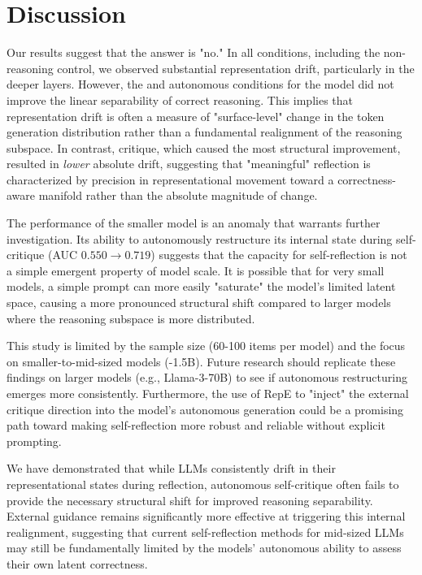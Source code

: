 \section{Discussion}
\label{sec:discussion}

 Our results suggest that the answer is "no." In all conditions, including the non-reasoning \rewrite control, we observed substantial representation drift, particularly in the deeper layers. However, the \rewrite and autonomous \selfone conditions for the \qwenonefive model did not improve the linear separability of correct reasoning. This implies that representation drift is often a measure of "surface-level" change in the token generation distribution rather than a fundamental realignment of the reasoning subspace. In contrast, \external critique, which caused the most structural improvement, resulted in \textit{lower} absolute drift, suggesting that "meaningful" reflection is characterized by precision in representational movement toward a correctness-aware manifold rather than the absolute magnitude of change.

 The performance of the smaller \qwenzerofive model is an anomaly that warrants further investigation. Its ability to autonomously restructure its internal state during self-critique (AUC $0.550 \rightarrow 0.719$) suggests that the capacity for self-reflection is not a simple emergent property of model scale. It is possible that for very small models, a simple prompt can more easily "saturate" the model's limited latent space, causing a more pronounced structural shift compared to larger models where the reasoning subspace is more distributed.

 This study is limited by the sample size (60-100 items per model) and the focus on smaller-to-mid-sized models (-1.5B). Future research should replicate these findings on larger models (e.g., Llama-3-70B) to see if autonomous restructuring emerges more consistently. 
 Furthermore, the use of RepE to "inject" the external critique direction into the model's autonomous generation could be a promising path toward making self-reflection more robust and reliable without explicit prompting.

 We have demonstrated that while LLMs consistently drift in their representational states during reflection, autonomous self-critique often fails to provide the necessary structural shift for improved reasoning separability. External guidance remains significantly more effective at triggering this internal realignment, suggesting that current self-reflection methods for mid-sized LLMs may still be fundamentally limited by the models' autonomous ability to assess their own latent correctness.
